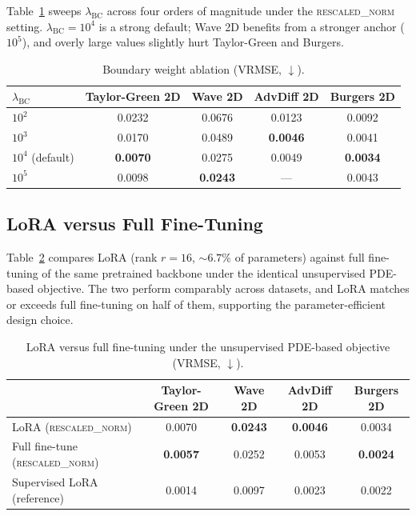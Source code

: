 \documentclass{article}
\begin{document}
Table~\ref{tab:app_lambda_bc} sweeps $\lambda_{\mathrm{BC}}$ across four orders of magnitude under the \textsc{rescaled\_norm} setting. $\lambda_{\mathrm{BC}}=10^4$ is a strong default; Wave 2D benefits from a stronger anchor ($10^5$), and overly large values slightly hurt Taylor-Green and Burgers.

\begin{table}[h]
\centering
\caption{Boundary weight ablation (VRMSE, $\downarrow$).}
\label{tab:app_lambda_bc}
\begin{tabular}{lcccc}
\toprule
$\lambda_{\mathrm{BC}}$ & Taylor-Green 2D & Wave 2D & AdvDiff 2D & Burgers 2D \\
\midrule
$10^2$ & 0.0232 & 0.0676 & 0.0123 & 0.0092 \\
$10^3$ & 0.0170 & 0.0489 & \textbf{0.0046} & 0.0041 \\
$10^4$ (default) & \textbf{0.0070} & 0.0275 & 0.0049 & \textbf{0.0034} \\
$10^5$ & 0.0098 & \textbf{0.0243} & --- & 0.0043 \\
\bottomrule
\end{tabular}
\end{table}

\subsection{LoRA versus Full Fine-Tuning}
\label{app:lora_vs_full}

Table~\ref{tab:app_lora_vs_full} compares LoRA (rank $r\!=\!16$, $\sim 6.7\%$ of parameters) against full fine-tuning of the same pretrained backbone under the identical unsupervised PDE-based objective. The two perform comparably across datasets, and LoRA matches or exceeds full fine-tuning on half of them, supporting the parameter-efficient design choice.

\begin{table}[h]
\centering
\caption{LoRA versus full fine-tuning under the unsupervised PDE-based objective (VRMSE, $\downarrow$).}
\label{tab:app_lora_vs_full}
\begin{tabular}{lcccc}
\toprule
& Taylor-Green 2D & Wave 2D & AdvDiff 2D & Burgers 2D \\
\midrule
LoRA (\textsc{rescaled\_norm}) & 0.0070 & \textbf{0.0243} & \textbf{0.0046} & 0.0034 \\
Full fine-tune (\textsc{rescaled\_norm}) & \textbf{0.0057} & 0.0252 & 0.0053 & \textbf{0.0024} \\
\midrule
Supervised LoRA (reference) & 0.0014 & 0.0097 & 0.0023 & 0.0022 \\
\bottomrule
\end{tabular}
\end{table}
\end{document}
